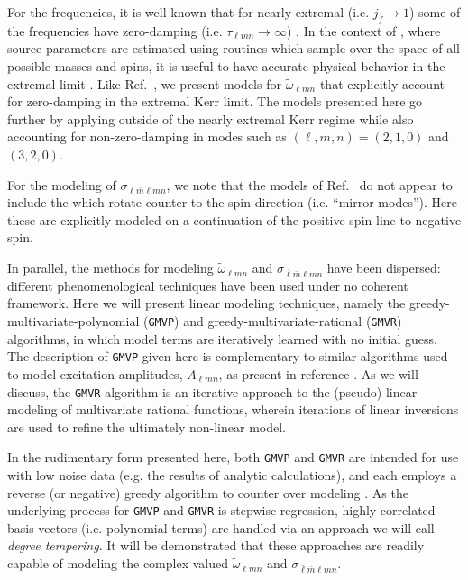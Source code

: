 \documentclass[twocolumn,aps,prd,floatfix,preprintnumbers,a4paper,nofootinbib,
superscriptaddress,10pt]{revtex4-1}
\newcommand{\cw}{\tilde{\omega}}
\def\jf{j_f}
\def\lmn{_{\ell m n}}
\def\LMlmn{_{\bar{\ell} \bar{m} \ell m n}}
\def\gmvp#1{greedy-multivariate-polynomial#1
  (\texttt{GMVP}#1)\gdef\gmvp{\texttt{GMVP}}}
\def\gmvr#1{greedy-multivariate-rational#1
  (\texttt{GMVR}#1)\gdef\gmvr{\texttt{GMVR}}}
\begin{document}
%
\par For the \qnm{} frequencies, it is well known that for nearly extremal  (i.e. $\jf \rightarrow 1$) some of the frequencies have zero-damping (i.e. $\tau\lmn \rightarrow \infty$) \cite{Yang:2012pj,Zimmerman:2015trm}.
%
In the context of \gw{} \da{}, where source parameters are estimated using routines which sample over the space of all possible \bh{} masses and spins, it is useful to have accurate physical behavior in the extremal limit \cite{TheLIGOScientific:2016wfe}.
%
Like Ref.~\cite{Cook:2014cta}, we present models for $\cw\lmn$ that explicitly account for zero-damping in the extremal Kerr limit.
%
The models presented here go further by applying outside of the nearly extremal Kerr regime while also accounting for non-zero-damping in modes such as $(\ell,m,n)=(2,1,0)$ and $(3,2,0)$\cite{Yang:2012pj}.
%
%
\par For the modeling of $\sigma\LMlmn$, we note that the models of Ref.~\cite{Berti:2014fga} do not appear to include the  which rotate counter to the \bh{} spin direction (i.e. ``mirror-modes'').
%
Here these \qnm{} are explicitly modeled on a continuation of the positive spin line to negative spin.
%
%
\par In parallel, the methods for modeling $\cw\lmn$ and $\sigma\LMlmn$ have been dispersed: different phenomenological techniques have been used under no coherent framework.
%
Here we will present linear modeling techniques, namely the \gmvp{} and \gmvr{} algorithms, in which model terms are iteratively learned with no initial guess.
%
The description of \gmvp{} given here is complementary to similar algorithms used to model \qnm{} excitation amplitudes, $A\lmn$, as present in reference \cite{Carullo:2018sfu,London:2018gaq,London:2014cma}.
%
As we will discuss, the \gmvr{} algorithm is an iterative approach to the (pseudo) linear modeling of multivariate rational functions, wherein iterations of linear inversions are used to refine the ultimately non-linear model.
%
\par In the rudimentary form presented here, both \gmvp{} and \gmvr{} are intended for use with low noise data (e.g. the results of analytic calculations), and each employs a reverse (or negative) greedy algorithm to counter over modeling \cite{Field:2011mf,Caudill:2011kv}.
%
As the underlying process for \gmvp{} and \gmvr{} is stepwise regression, highly correlated basis vectors (i.e. polynomial terms) are handled via an approach we will call \textit{degree tempering}.
%
It will be demonstrated that these approaches are readily capable of modeling the complex valued $\cw\lmn$ and $\sigma\LMlmn$.
\end{document}
